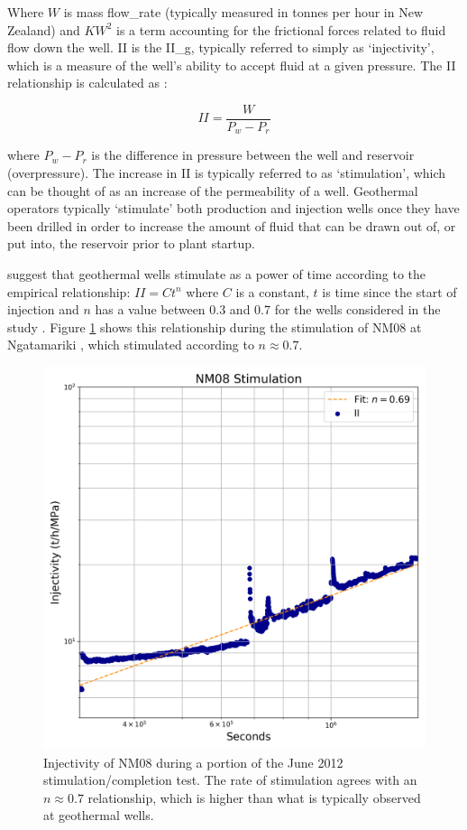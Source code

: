 Where $W$ is mass \gls{flow_rate} (typically measured in tonnes per hour in New Zealand) and $KW^{2}$ is a term accounting for the frictional forces related to fluid flow down the well. \acrshort{II} is the \gls{II_g}, typically referred to simply as `injectivity', which is a measure of the well's ability to accept fluid at a given pressure. The \acrshort{II} relationship is calculated as \citep{DiPippo_2016}:

\begin{equation}
II = \frac{W}{P_{w} - P_{r}}
\end{equation}

where $P_{w} - P_{r}$ is the difference in pressure between the well and reservoir (overpressure). The increase in \acrshort{II} is typically referred to as `\gls{stimulation}', which can be thought of as an increase of the permeability of a well. Geothermal operators typically `stimulate' both production and injection wells once they have been drilled in order to increase the amount of fluid that can be drawn out of, or put into, the reservoir prior to plant startup.

\citet{grant2013thermal} suggest that geothermal wells stimulate as a power of time according to the empirical relationship: $II = Ct^{n}$ where $C$ is a constant, $t$ is time since the start of injection and $n$ has a value between 0.3 and 0.7 for the wells considered in the study \citep{grant2013thermal}. Figure \ref{415417} shows this relationship during the stimulation of NM08 at Ngatamariki \citep{Clearwater_2015}, which stimulated according to $n\approx0.7$.

\begin{figure}[h!]
\begin{center}
\includegraphics[width=0.70\columnwidth]{Chapter_1_Intro/figures/NM08_JC_ported_II_fitted/NM08_JC_ported_II_fitted_original}
\caption{{Injectivity of NM08 during a portion of the June 2012
stimulation\slash{completion} test. The rate of stimulation agrees with an
\(n\approx0.7\) relationship, which is higher than what is typically
observed at geothermal wells.
{\label{415417}}%
}}
\end{center}
\end{figure}

